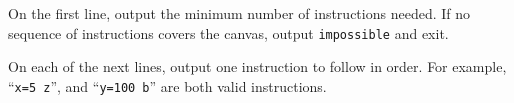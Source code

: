

On the first line, output the minimum number of instructions needed. If no
sequence of instructions covers the canvas, output \texttt{impossible} and exit.

On each of the next lines, output one instruction to follow in order. For
example, ``\texttt{x=5 z}'', and ``\texttt{y=100 b}'' are both valid instructions. 
